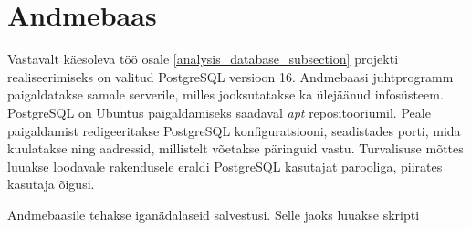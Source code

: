 \section{Andmebaas}
Vastavalt käesoleva töö osale \ref{analysis_database_subsection} projekti realiseerimiseks
on valitud PostgreSQL versioon 16. Andmebaasi juhtprogramm paigaldatakse samale serverile, milles 
jooksutatakse ka ülejäänud infosüsteem. PostgreSQL on Ubuntus paigaldamiseks saadaval
\textit{apt} repositooriumil. Peale paigaldamist redigeeritakse PostgreSQL konfiguratsiooni,
seadistades porti, mida kuulatakse ning aadressid, millistelt võetakse päringuid vastu.
Turvalisuse mõttes luuakse loodavale rakendusele eraldi PostgreSQL kasutajat parooliga, piirates kasutaja õigusi.

Andmebaasile tehakse iganädalaseid salvestusi. Selle jaoks luuakse skripti 



